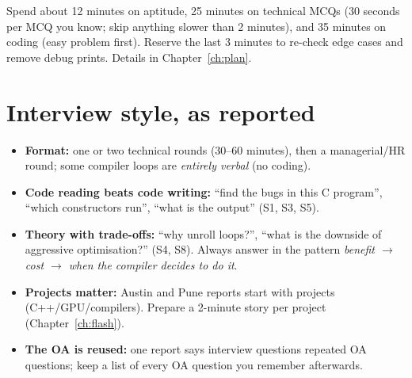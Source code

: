 \documentclass[10pt,a4paper,openany,oneside]{report}
\newcommand{\prio}[1]{\texorpdfstring{\ifcase#1\or{\color{gold}\ding{72}}\or{\color{gold}\ding{72}\ding{72}}\or{\color{gold}\ding{72}\ding{72}\ding{72}}\fi}{}}
\begin{document}
\begin{tipbox}
Spend about 12 minutes on aptitude, 25 minutes on technical MCQs (30 seconds per MCQ you know; skip anything slower than 2 minutes), and 35 minutes on coding
(easy problem first). Reserve the last 3 minutes to re-check edge cases and remove debug prints. Details in Chapter~\ref{ch:plan}.
\end{tipbox}

\section{Interview style, as reported \prio{2}}
\begin{itemize}
\item \textbf{Format:} one or two technical rounds (30--60 minutes), then a managerial/HR round; some compiler loops are \emph{entirely verbal} (no coding).
\item \textbf{Code reading beats code writing:} ``find the bugs in this C program'', ``which constructors run'', ``what is the output'' (S1, S3, S5).
\item \textbf{Theory with trade-offs:} ``why unroll loops?'', ``what is the downside of aggressive optimisation?'' (S4, S8). Always answer in the pattern
 \emph{benefit $\to$ cost $\to$ when the compiler decides to do it}.
\item \textbf{Projects matter:} Austin and Pune reports start with projects (C++/GPU/compilers). Prepare a 2-minute story per project (Chapter~\ref{ch:flash}).
\item \textbf{The OA is reused:} one report says interview questions repeated OA questions; keep a list of every OA question you remember afterwards.
\end{itemize}
\end{document}
